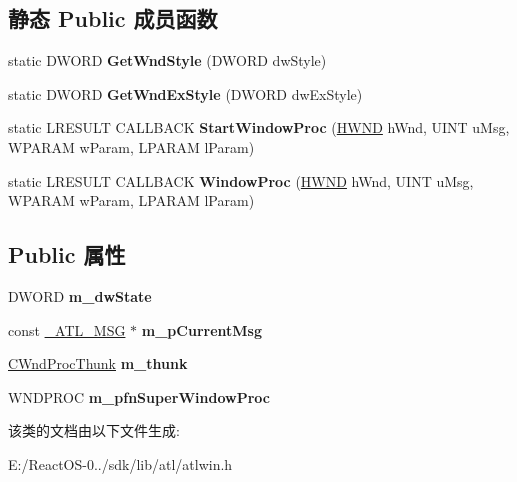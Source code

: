 \subsection*{静态 Public 成员函数}
\begin{DoxyCompactItemize}
\item 
\mbox{\label{class_a_t_l_1_1_c_window_impl_base_t_a8950399c050defad5145416c40b4451d}} 
static D\+W\+O\+RD {\bfseries Get\+Wnd\+Style} (D\+W\+O\+RD dw\+Style)
\item 
\mbox{\label{class_a_t_l_1_1_c_window_impl_base_t_a6d8fffb9edf3a1ed05c88a23256ad3c9}} 
static D\+W\+O\+RD {\bfseries Get\+Wnd\+Ex\+Style} (D\+W\+O\+RD dw\+Ex\+Style)
\item 
\mbox{\label{class_a_t_l_1_1_c_window_impl_base_t_a3b7552da78caf9fa0f5b99acb0831b2a}} 
static L\+R\+E\+S\+U\+LT C\+A\+L\+L\+B\+A\+CK {\bfseries Start\+Window\+Proc} (\hyperlink{interfacevoid}{H\+W\+ND} h\+Wnd, U\+I\+NT u\+Msg, W\+P\+A\+R\+AM w\+Param, L\+P\+A\+R\+AM l\+Param)
\item 
\mbox{\label{class_a_t_l_1_1_c_window_impl_base_t_a3f92ab4900f440832b63bb6090ef397f}} 
static L\+R\+E\+S\+U\+LT C\+A\+L\+L\+B\+A\+CK {\bfseries Window\+Proc} (\hyperlink{interfacevoid}{H\+W\+ND} h\+Wnd, U\+I\+NT u\+Msg, W\+P\+A\+R\+AM w\+Param, L\+P\+A\+R\+AM l\+Param)
\end{DoxyCompactItemize}
\subsection*{Public 属性}
\begin{DoxyCompactItemize}
\item 
\mbox{\label{class_a_t_l_1_1_c_window_impl_base_t_a71efe3836a248486ca07c8061c6c84f0}} 
D\+W\+O\+RD {\bfseries m\+\_\+dw\+State}
\item 
\mbox{\label{class_a_t_l_1_1_c_window_impl_base_t_a0ebb9c418ca0103b95460f96f5ab8520}} 
const \hyperlink{struct_a_t_l_1_1___a_t_l___m_s_g}{\+\_\+\+A\+T\+L\+\_\+\+M\+SG} $\ast$ {\bfseries m\+\_\+p\+Current\+Msg}
\item 
\mbox{\label{class_a_t_l_1_1_c_window_impl_base_t_a344e5050ea88e873b5b627fd46811da4}} 
\hyperlink{class_a_t_l_1_1_c_wnd_proc_thunk}{C\+Wnd\+Proc\+Thunk} {\bfseries m\+\_\+thunk}
\item 
\mbox{\label{class_a_t_l_1_1_c_window_impl_base_t_af446580beb1cca50aea36673a3ae4161}} 
W\+N\+D\+P\+R\+OC {\bfseries m\+\_\+pfn\+Super\+Window\+Proc}
\end{DoxyCompactItemize}


该类的文档由以下文件生成\+:\begin{DoxyCompactItemize}
\item 
E\+:/\+React\+O\+S-\/0../sdk/lib/atl/atlwin.\+h\end{DoxyCompactItemize}
